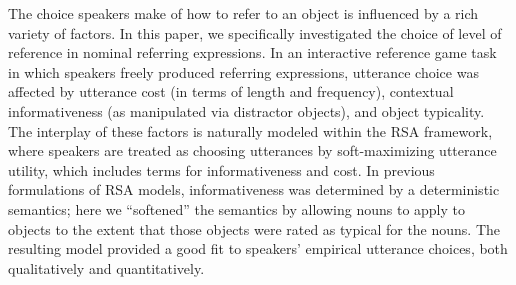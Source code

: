 \documentclass[10pt,letterpaper]{article}
\newcommand{\jd}[1]{\textcolor{Blue}{[jd: #1]}}
\newcommand{\ndg}[1]{\textcolor{Green}{[ndg: #1]}}
\begin{document}

The choice speakers make of how to refer to an object is influenced by a rich variety of factors.
In this paper, we specifically investigated the choice of level of reference in nominal referring expressions. In an interactive reference game task in which speakers freely produced referring expressions, utterance choice was affected by utterance cost (in terms of length and frequency), contextual informativeness (as manipulated via distractor objects), and object typicality.
%
The interplay of these factors is naturally modeled within the RSA framework, where speakers are treated as choosing utterances by soft-maximizing utterance utility, which includes terms for informativeness and cost. In previous formulations of RSA models, informativeness was determined by a deterministic semantics; here we ``softened'' the semantics by allowing nouns to apply to objects to the extent that those objects were rated as typical for the nouns.
The resulting model provided a good fit to speakers' empirical utterance choices, both qualitatively and quantitatively. 



\end{document}

